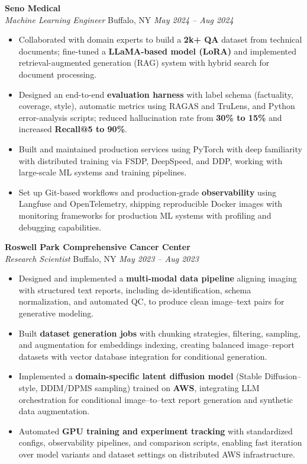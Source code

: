 \vspace*{-1pt}
\item \textbf{Seno Medical}\\
\textit{Machine Learning Engineer} \hfill Buffalo, NY \quad \textit{May 2024 -- Aug 2024}
\vspace*{-3pt}
\begin{itemize}[leftmargin=0.2in, topsep=1pt]
  \item Collaborated with domain experts to build a \textbf{2k+ QA} dataset from technical documents; fine-tuned a \textbf{LLaMA-based model (LoRA)} and implemented retrieval-augmented generation (RAG) system with hybrid search for document processing.
  \item Designed an end-to-end \textbf{evaluation harness} with label schema (factuality, coverage, style), automatic metrics using RAGAS and TruLens, and Python error-analysis scripts; reduced hallucination rate from \textbf{30\% to 15\%} and increased \textbf{Recall@5 to 90\%}.
  \item Built and maintained production services using PyTorch with deep familiarity with distributed training via FSDP, DeepSpeed, and DDP, working with large-scale ML systems and training pipelines.
  \item Set up Git-based workflows and production-grade \textbf{observability} using Langfuse and OpenTelemetry, shipping reproducible Docker images with monitoring frameworks for production ML systems with profiling and debugging capabilities.
\end{itemize}

\vspace*{-1pt}
\item \textbf{Roswell Park Comprehensive Cancer Center}\\
\textit{Research Scientist} \hfill Buffalo, NY \quad \textit{May 2023 -- Aug 2023}
\vspace*{-3pt}
\begin{itemize}[leftmargin=0.2in, topsep=1pt]
  \item Designed and implemented a \textbf{multi-modal data pipeline} aligning imaging with structured text reports, including de-identification, schema normalization, and automated QC, to produce clean image–text pairs for generative modeling.
  \item Built \textbf{dataset generation jobs} with chunking strategies, filtering, sampling, and augmentation for embeddings indexing, creating balanced image–report datasets with vector database integration for conditional generation.
  \item Implemented a \textbf{domain-specific latent diffusion model} (Stable Diffusion–style, DDIM/DPMS sampling) trained on \textbf{AWS}, integrating LLM orchestration for conditional image–to–text report generation and synthetic data augmentation.
  \item Automated \textbf{GPU training and experiment tracking} with standardized configs, observability pipelines, and comparison scripts, enabling fast iteration over model variants and dataset settings on distributed AWS infrastructure.
\end{itemize}
